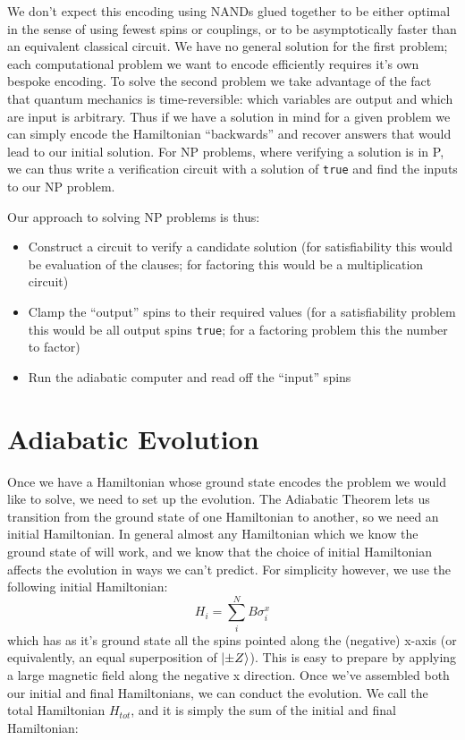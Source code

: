 We don't expect this encoding using NANDs glued together to be either optimal in the sense of using fewest spins or couplings, or to be asymptotically faster than an equivalent classical circuit.  We have no general solution for the first problem; each computational problem we want to encode efficiently requires it's own bespoke encoding.  To solve the second problem we take advantage of the fact that quantum mechanics is time-reversible: which variables are output and which are input is arbitrary.  Thus if we have a solution in mind for a given problem we can simply encode the Hamiltonian ``backwards'' and recover answers that would lead to our initial solution.  For NP problems, where verifying a solution is in P, we can thus write a verification circuit with a solution of \texttt{true} and find the inputs to our NP problem.

Our approach to solving NP problems is thus:
\begin{itemize}
	\item Construct a circuit to verify a candidate solution (for satisfiability this would be evaluation of the clauses; for factoring this would be a multiplication circuit)
	\item Clamp the ``output'' spins to their required values (for a satisfiability problem this would be all output spins \texttt{true}; for a factoring problem this the number to factor)
	\item Run the adiabatic computer and read off the ``input'' spins
\end{itemize}

\section{Adiabatic Evolution}
Once we have a Hamiltonian whose ground state encodes the problem we would like to solve, we need to set up the evolution.  The Adiabatic Theorem lets us transition from the ground state of one Hamiltonian to another, so we need an initial Hamiltonian.  In general almost any Hamiltonian which we know the ground state of will work, and we know that the choice of initial Hamiltonian affects the evolution in ways we can't predict.  For simplicity however, we use the following initial Hamiltonian:
\begin{displaymath}
	H_i = \sum_i^N B \sigma_i^x
\end{displaymath}
which has as it's ground state all the spins pointed along the (negative) x-axis (or equivalently, an equal superposition of $\mathinner{|{\pm Z}\rangle}$).  This is easy to prepare by applying a large magnetic field along the negative x direction.
Once we've assembled both our initial and final Hamiltonians, we can conduct the evolution.  We call the total Hamiltonian $H_{tot}$, and it is simply the sum of the initial and final Hamiltonian:

